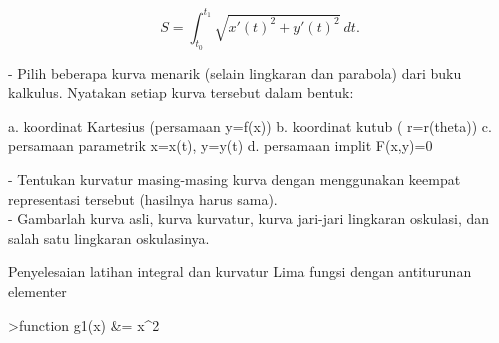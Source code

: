\documentclass[a4paper,10pt]{article}
\begin{document}
\begin{eulernotebook}
\begin{eulercomment}
\end{eulercomment}
\begin{eulerformula}
\[
S=\int_{t_0}^{t_1} \sqrt{x'(t)^2+y'(t)^2}\ dt.
\]
\end{eulerformula}
\begin{eulercomment}
- Pilih beberapa kurva menarik (selain lingkaran dan parabola) dari buku  kalkulus. Nyatakan setiap kurva tersebut dalam bentuk:\\
\end{eulercomment}
\begin{eulerttcomment}
  a. koordinat Kartesius (persamaan y=f(x))
  b. koordinat kutub ( r=r(theta))
  c. persamaan parametrik x=x(t), y=y(t)
  d. persamaan implit F(x,y)=0
\end{eulerttcomment}
\begin{eulercomment}
- Tentukan kurvatur masing-masing kurva dengan menggunakan keempat representasi tersebut (hasilnya harus sama).\\
- Gambarlah kurva asli, kurva kurvatur, kurva jari-jari lingkaran oskulasi, dan salah satu lingkaran oskulasinya.
\end{eulercomment}
\begin{eulercomment}
Penyelesaian latihan integral dan kurvatur
Lima fungsi dengan antiturunan elementer
\end{eulercomment}
\begin{eulerprompt}
>function g1(x) &= x^2
\end{eulerprompt}
\begin{euleroutput}
  

\end{euleroutput}
\end{eulernotebook}
\end{document}

